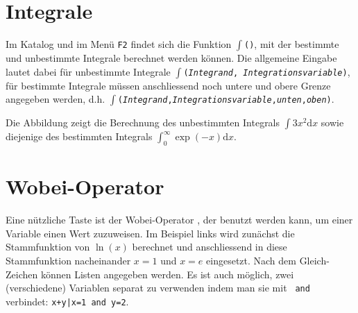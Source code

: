 \documentclass[a4paper,11pt,notitlepage,halfparskip,headsepline,normalheadings,twoside]{scrartcl}
\newlength{\tikey}
\newcommand{\keystroke}[1]{\settowidth{\tikey}{\scriptsize #1}\psframebox[framearc=0.2]{\parbox{\tikey}{\scriptsize\textsf{#1}}}}
\begin{document}
\section{Integrale}
\begin{window}
Im Katalog und im Menü \texttt{F2} findet sich die Funktion \texttt{$\int$()},
mit der bestimmte und unbestimmte Integrale berechnet werden können.
Die allgemeine Eingabe lautet dabei für unbestimmte Integrale
\texttt{$\int$(\textit{Integrand}, \textit{Integrationsvariable})}, für bestimmte
Integrale müssen anschliessend noch untere und obere Grenze angegeben werden,
d.h.
\texttt{$\int$(\textit{Integrand},\textit{Integrationsvariable},\textit{unten},\textit{oben})}.

Die Abbildung zeigt die Berechnung des unbestimmten Integrals $\int 3x^2\mathrm{d}x$
sowie diejenige des bestimmten Integrals $\int_0^\infty\exp(-x)\mathrm{d}x$.
\end{window}

\section{Wobei-Operator}
\begin{window}
Eine nützliche Taste ist der Wobei-Operator \keystroke{$|$}, der benutzt werden
kann, um einer Variable einen Wert zuzuweisen. Im Beispiel links wird zunächst
die Stammfunktion von $\ln(x)$ berechnet und anschliessend in diese Stammfunktion
nacheinander $x=1$ und $x=e$ eingesetzt. Nach dem Gleich-Zeichen können
Listen angegeben werden. Es ist auch möglich, zwei (verschiedene) Variablen
separat zu verwenden indem man sie mit \texttt{\textvisiblespace
and\textvisiblespace} verbindet: \texttt{x+y|x=1 and y=2}.
\end{window}
\end{document}
